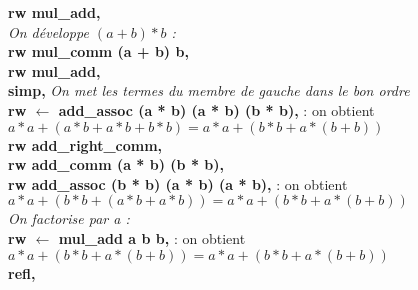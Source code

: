 \documentclass{article}
\begin{document}
  \textbf{rw mul\_add,} \\
  \textit{On développe $(a + b) * b$ :} \\
 \textbf{ rw mul\_comm (a + b) b,} \\
  \textbf{rw mul\_add,} \\
 \textbf{simp,}  \textit{On met les termes du membre de gauche dans le bon ordre } \\
  \textbf{rw $\leftarrow$ add\_assoc (a * b) (a * b) (b * b),} : on obtient $a * a + (a * b + a * b + b * b) = a * a + (b * b + a * (b + b))$\\
  \textbf{rw add\_right\_comm,} \\
  \textbf{rw add\_comm (a * b) (b * b),} \\
  \textbf{rw add\_assoc (b * b) (a * b) (a * b),} : on obtient $a * a + (b * b + (a * b + a * b)) = a * a + (b * b + a * (b + b))$\\
  \textit{On factorise par a :}\\
  \textbf{rw $\leftarrow$ mul\_add a b b,} : on obtient $a * a + (b * b + a * (b + b)) = a * a + (b * b + a * (b + b))
$\\
  \textbf{refl,}\\
\end{document}
